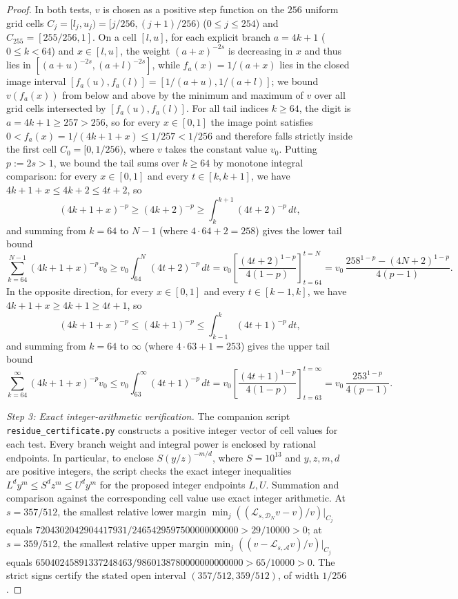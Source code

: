\documentclass[11pt]{article}
\theoremstyle{definition}
\theoremstyle{remark}
\begin{document}
\begin{proof}
In both tests, $v$ is chosen as a positive step function on the $256$ uniform
grid cells $C_j=[l_j,u_j)=[j/256,(j+1)/256)$ ($0\le j\le254$) and
$C_{255}=[255/256,1]$. On a cell $[l,u]$, for each explicit branch $a=4k+1$
($0\le k<64$) and $x\in[l,u]$, the weight $(a+x)^{-2s}$ is decreasing in $x$
and thus lies in $[(a+u)^{-2s},(a+l)^{-2s}]$, while $f_a(x)=1/(a+x)$ lies in the
closed image interval $[f_a(u),f_a(l)]=[1/(a+u),1/(a+l)]$; we bound $v(f_a(x))$
from below and above by the minimum and maximum of $v$ over all grid cells
intersected by $[f_a(u),f_a(l)]$. For all tail indices $k\ge64$, the digit is
$a=4k+1\ge257>256$, so for every $x\in[0,1]$ the image point satisfies
$0<f_a(x)=1/(4k+1+x)\le 1/257<1/256$ and therefore falls strictly inside the
first cell $C_0=[0,1/256)$, where $v$ takes the constant value $v_0$. Putting
$p:=2s>1$, we bound the tail sums over $k\ge64$ by monotone integral comparison:
for every $x\in[0,1]$ and every $t\in[k,k+1]$, we have
$4k+1+x\le 4k+2\le 4t+2$, so
\[
(4k+1+x)^{-p}\ge(4k+2)^{-p}\ge\int_k^{k+1}(4t+2)^{-p}\,dt,
\]
and summing from $k=64$ to $N-1$ (where $4\cdot64+2=258$) gives the lower tail
bound
\[
 \sum_{k=64}^{N-1}(4k+1+x)^{-p}v_0
 \ge v_0\int_{64}^N(4t+2)^{-p}\,dt
 =v_0\left[\frac{(4t+2)^{1-p}}{4(1-p)}\right]_{t=64}^{t=N}
 =v_0\,\frac{258^{1-p}-(4N+2)^{1-p}}{4(p-1)}.
\]
In the opposite direction, for every $x\in[0,1]$ and every $t\in[k-1,k]$, we
have $4k+1+x\ge 4k+1\ge 4t+1$, so
\[
(4k+1+x)^{-p}\le(4k+1)^{-p}\le\int_{k-1}^k(4t+1)^{-p}\,dt,
\]
and summing from $k=64$ to $\infty$ (where $4\cdot63+1=253$) gives the upper
tail bound
\[
 \sum_{k=64}^{\infty}(4k+1+x)^{-p}v_0
 \le v_0\int_{63}^\infty(4t+1)^{-p}\,dt
 =v_0\left[\frac{(4t+1)^{1-p}}{4(1-p)}\right]_{t=63}^{t=\infty}
 =v_0\,\frac{253^{1-p}}{4(p-1)} .
\]

\emph{Step 3: Exact integer-arithmetic verification.}
The companion script \texttt{residue\_certificate.py} constructs a
positive integer vector of cell values for each test. Every branch
weight and integral power is enclosed by rational endpoints. In
particular, to enclose $S(y/z)^{-m/d}$, where $S=10^{13}$ and
$y,z,m,d$ are positive integers, the script checks the exact
integer inequalities $L^d y^m\le S^d z^m\le U^d y^m$ for the proposed
integer endpoints $L,U$. Summation and comparison against the
corresponding cell value use exact integer arithmetic. At $s=357/512$, the
smallest relative lower margin $\min_j((\mathcal L_{s,\mathcal D_N}v-v)/v)|_{C_j}$
equals
$7204302042904417931/2465429597500000000000>29/10000>0$; at $s=359/512$, the
smallest relative upper margin $\min_j((v-\mathcal L_{s,\mathcal A}v)/v)|_{C_j}$
equals
$65040245891337248463/9860138780000000000000>65/10000>0$. The
strict signs certify the stated open interval $(357/512,359/512)$, of width
$1/256$.
\end{proof}
\end{document}
